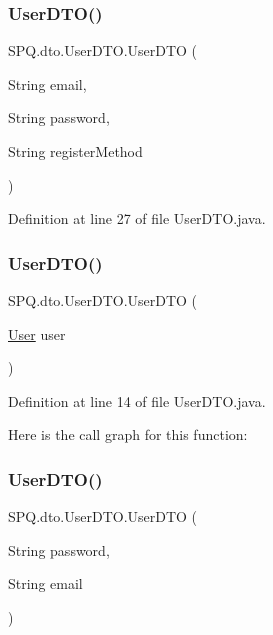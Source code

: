 \subsubsection{\texorpdfstring{User\+D\+T\+O()}{UserDTO()}\hspace{0.1cm}{\footnotesize\ttfamily [3/11]}}
{\footnotesize\ttfamily S\+P\+Q.\+dto.\+User\+D\+T\+O.\+User\+D\+TO (\begin{DoxyParamCaption}\item[{String}]{email,  }\item[{String}]{password,  }\item[{String}]{register\+Method }\end{DoxyParamCaption})}



Definition at line 27 of file User\+D\+T\+O.\+java.

\mbox{\label{class_s_p_q_1_1dto_1_1_user_d_t_o_a40cad7b1dea2117ed4cb0e69fdc6b929}} 
\subsubsection{\texorpdfstring{User\+D\+T\+O()}{UserDTO()}\hspace{0.1cm}{\footnotesize\ttfamily [4/11]}}
{\footnotesize\ttfamily S\+P\+Q.\+dto.\+User\+D\+T\+O.\+User\+D\+TO (\begin{DoxyParamCaption}\item[{\mbox{\hyperlink{class_s_p_q_1_1data_1_1_user}{User}}}]{user }\end{DoxyParamCaption})}



Definition at line 14 of file User\+D\+T\+O.\+java.

Here is the call graph for this function\+:
\mbox{\label{class_s_p_q_1_1dto_1_1_user_d_t_o_a985590805ac057d894623b83b1042e29}} 
\subsubsection{\texorpdfstring{User\+D\+T\+O()}{UserDTO()}\hspace{0.1cm}{\footnotesize\ttfamily [5/11]}}
{\footnotesize\ttfamily S\+P\+Q.\+dto.\+User\+D\+T\+O.\+User\+D\+TO (\begin{DoxyParamCaption}\item[{String}]{password,  }\item[{String}]{email }\end{DoxyParamCaption})}



